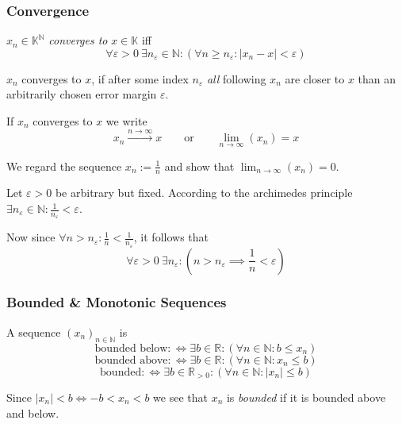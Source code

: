 \subsubsection{Convergence}
\begin{definition}\label{def:conv_seq}
   \(x_n \in \mathbb{K}^\mathbb{N}\) \emph{converges to} \(x \in \mathbb{K}\) iff
   \[\forall \varepsilon > 0~\exists n_\varepsilon \in \mathbb{N}: (\forall n \geq n_\varepsilon: |x_n - x| < \varepsilon)\]
\end{definition}
\begin{remark}[Intuition]
   \(x_n\) converges to \(x\), if after some index \(n_\varepsilon\) \emph{all} following \(x_n\) are closer to \(x\) than an arbitrarily chosen error margin \(\varepsilon\).
\end{remark}
\begin{remark}[Notation]
   If \(x_n\) converges to \(x\) we write
   \[x_n \xrightarrow{n \to \infty} x \qquad\text{or}\qquad \lim_{n \to \infty}(x_n) = x\]
\end{remark}
\begin{example}
   We regard the sequence \(x_n := \frac{1}{n}\) and show that \(\lim_{n \to \infty}(x_n) = 0\).

   Let \(\varepsilon > 0\) be arbitrary but fixed.
   According to the archimedes principle \(\exists n_\varepsilon \in \mathbb{N}: \frac{1}{n_\varepsilon} < \varepsilon\).

   Now since \(\forall n > n_\varepsilon: \frac{1}{n} < \frac{1}{n_\varepsilon}\), it follows that
   \[\forall \varepsilon > 0~\exists n_\varepsilon: \left(n > n_\varepsilon \implies \frac{1}{n} < \varepsilon\right)\]

   \begin{center}
      
   \end{center}
\end{example}

\subsubsection{Bounded \& Monotonic Sequences}
\begin{definition}
   A sequence \((x_n)_{n \in \mathbb{N}}\) is
   \[\text{bounded below} :\iff \exists b \in \mathbb{R}: (\forall n \in \mathbb{N}: b \leq x_n)\]
   \[\text{bounded above} :\iff \exists b \in \mathbb{R}: (\forall n \in \mathbb{N}: x_n \leq b)\]
   \[\text{bounded} :\iff \exists b \in \mathbb{R}_{>0}: (\forall n \in \mathbb{N}: |x_n| \leq b)\]
\end{definition}
\begin{remark}
   Since \(\lvert x_n \rvert < b \iff -b < x_n < b\) we see that \(x_n\) is \emph{bounded} if it is bounded above and below.
\end{remark}

